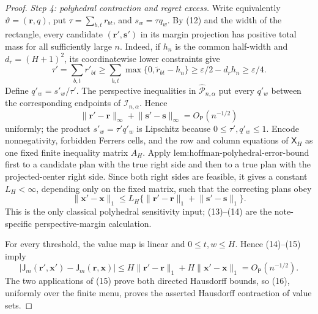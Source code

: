 \documentclass{article}
\begin{document}
\begin{proof}
\emph{Step 4: polyhedral contraction and regret excess.}
Write equivalently \(\vartheta=(\mathbf r,q)\), put \(\tau=\sum_{b,t}r_{bt}\), and
\(s_w=\tau q_w\).  By (12) and the width of the rectangle, every candidate
\((\mathbf r',\mathbf s')\) in its margin projection has positive total mass for all sufficiently large \(n\).  Indeed, if \(h_n\) is the common half-width and \(d_r=(H+1)^2\), its coordinatewise lower constraints give
\[
 \tau'=\sum_{b,t}r'_{bt}
 \ge\sum_{b,t}\max\{0,\widetilde r_{bt}-h_n\}
 \ge\varepsilon/2-d_rh_n\ge\varepsilon/4.                \tag{13}
\]
Define \(q'_w=s'_w/\tau'\).  The perspective inequalities in
\(\widehat{\mathcal P}_{n,\alpha}\) put every \(q'_w\) between the corresponding endpoints of \(\mathcal I_{n,\alpha}\).  Hence
\[
 \lVert\mathbf r'-\mathbf r\rVert_\infty
 +\lVert\mathbf s'-\mathbf s\rVert_\infty
 =O_{\mathsf P}(n^{-1/2})                                \tag{14}
\]
uniformly; the product \(s'_w=\tau' q'_w\) is Lipschitz because
\(0\le\tau',q'_w\le1\).  Encode nonnegativity, forbidden Ferrers cells, and the row and column equations of \(\mathsf X_H\) as one fixed finite inequality matrix \(A_H\).  Apply \(\text{lem:hoffman-polyhedral-error-bound}\) first to a candidate plan with the true right side and then to a true plan with the projected-center right side.  Since both right sides are feasible, it gives a constant \(L_H<\infty\), depending only on the fixed matrix, such that the correcting plans obey
\[
 \lVert\mathbf x'-\mathbf x\rVert_1
 \le L_H\{
 \lVert\mathbf r'-\mathbf r\rVert_1+
 \lVert\mathbf s'-\mathbf s\rVert_1\}.                  \tag{15}
\]
This is the only classical polyhedral sensitivity input; (13)--(14) are the note-specific perspective-margin calculation.

For every threshold, the value map is linear and \(0\le t,w\le H\).  Hence (14)--(15) imply
\[
 |\mathsf J_m(\mathbf r',\mathbf x')-
   \mathsf J_m(\mathbf r,\mathbf x)|
 \le H\lVert\mathbf r'-\mathbf r\rVert_1+
      H\lVert\mathbf x'-\mathbf x\rVert_1
 =O_{\mathsf P}(n^{-1/2}).                               \tag{16}
\]
The two applications of (15) prove both directed Hausdorff bounds, so (16), uniformly over the finite menu, proves the asserted Hausdorff contraction of value sets.


\end{proof}
\end{document}
